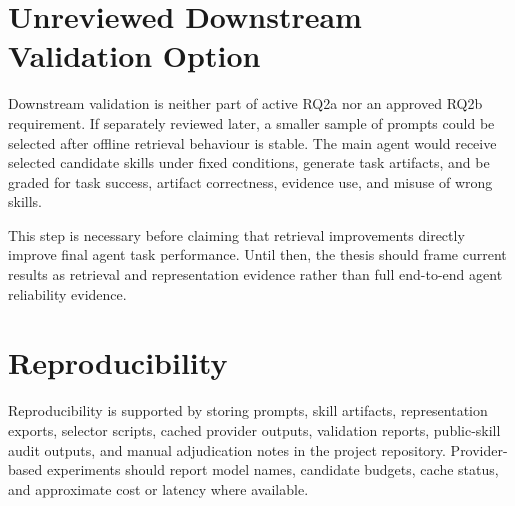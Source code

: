 \section{Unreviewed Downstream Validation Option}

Downstream validation is neither part of active RQ2a nor an approved RQ2b requirement. If separately reviewed later, a smaller sample of prompts could be selected after offline retrieval behaviour is stable. The main agent would receive selected candidate skills under fixed conditions, generate task artifacts, and be graded for task success, artifact correctness, evidence use, and misuse of wrong skills.

This step is necessary before claiming that retrieval improvements directly improve final agent task performance. Until then, the thesis should frame current results as retrieval and representation evidence rather than full end-to-end agent reliability evidence.

\section{Reproducibility}

Reproducibility is supported by storing prompts, skill artifacts, representation exports, selector scripts, cached provider outputs, validation reports, public-skill audit outputs, and manual adjudication notes in the project repository. Provider-based experiments should report model names, candidate budgets, cache status, and approximate cost or latency where available.
